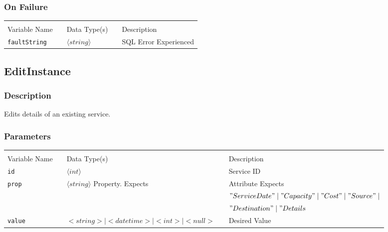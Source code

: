 \subsubsection{On Failure}

\begin{tabular}{lllll}
				&	&	&	&	\\
Variable Name	&		&	Data Type(s)		&	&	Description	\\
\verb!faultString! & \hspace{15mm} & $\langle string\rangle $ & \hspace{15mm} & SQL Error Experienced \\
\end{tabular}


\subsection{EditInstance}

\subsubsection{Description}

Edits details of an existing service.

\subsubsection{Parameters}

\begin{tabular}{lllll}
				&	&	&	&	\\
Variable Name	&		&	Data Type(s)		&	&	Description	\\
\verb!id! & \hspace{15mm} & $\langle int\rangle $ & \hspace{15mm} & Service ID \\
\verb!prop! & \hspace{15mm} & $\langle string\rangle $ Property. Expects
& \hspace{15mm} & Attribute  Expects \\
	&	&	&	&	$"ServiceDate" \mid "Capacity" \mid "Cost" \mid "Source" \mid $ \\
	&	&	&	&	$"Destination" \mid"Details$ \\
\verb!value! & \hspace{15mm} & $<string> \mid <datetime> \mid <int> \mid
<null>$  & \hspace{15mm} & Desired Value \\
\end{tabular}

